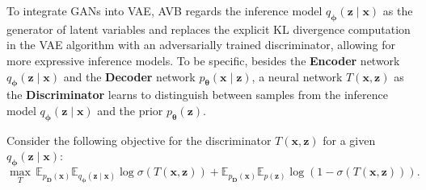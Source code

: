 \documentclass[a4paper,12pt]{article}
\theoremstyle{plain} %
\theoremstyle{remark} %
\theoremstyle{definition} %
\begin{document}
To integrate GANs into VAE, AVB regards the inference model $q_{\bm{\phi}}(\bm{z}\mid\bm{x})$ as the generator of latent variables and replaces the explicit KL divergence computation in the VAE algorithm with an adversarially trained discriminator, allowing for more expressive inference models. To be specific, besides the \textbf{Encoder} network $q_{\bm{\phi}}(\bm{z}\mid\bm{x})$ and the \textbf{Decoder} network $p_{\bm{\theta}}(\bm{x} \mid \bm{z})$, a neural network $T(\bm{x}, \bm{z})$ as the \textbf{Discriminator} learns to distinguish between samples from the inference model $q_{\bm{\phi}}(\bm{z}\mid\bm{x})$ and the prior $p_{\bm{\theta}}(\bm{z})$.

Consider the following objective for the discriminator 
$T(\bm{x}, \bm{z})$ for a given $q_{\bm{\phi}}(\bm{z} \mid \bm{x})$:
\begin{equation}\label{eq:T}
\max_{T} \, \mathbb{E}_{p_{\bm{D}}(\bm{x})} 
\mathbb{E}_{q_{\bm{\phi}}(\bm{z} \mid \bm{x})} 
\log \sigma \left( T(\bm{x}, \bm{z}) \right) 
+ \mathbb{E}_{p_{\bm{D}}(\bm{x})} 
\mathbb{E}_{p(\bm{z})} 
\log \left( 1 - \sigma \left( T(\bm{x}, \bm{z}) \right) \right). 
\end{equation}
\end{document}
